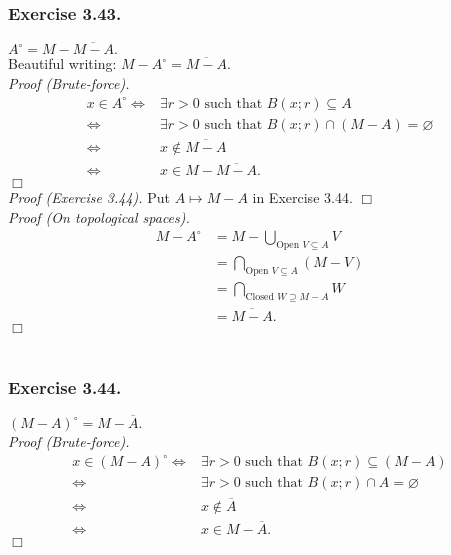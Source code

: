 \documentclass{article}
\begin{document}
\subsubsection*{Exercise 3.43.}
\emph{$A^{\circ} = M - \overline{M - A}.$} \\

Beautiful writing: $M - A^{\circ} = \overline{M - A}$. \\

\emph{Proof (Brute-force).}
\begin{align*}
x \in A^{\circ}
\Longleftrightarrow&
\exists r > 0 \text{ such that } B(x;r) \subseteq A \\
\Longleftrightarrow&
\exists r > 0 \text{ such that } B(x;r) \cap (M - A) = \varnothing \\
\Longleftrightarrow&
x \not\in \overline{M - A} \\
\Longleftrightarrow&
x \in M - \overline{M - A}.
\end{align*}
$\Box$ \\

\emph{Proof (Exercise 3.44).}
Put $A \mapsto M-A$ in Exercise 3.44.
$\Box$ \\

\emph{Proof (On topological spaces).}
\begin{align*}
M - A^{\circ}
&= M - \bigcup_{\text{Open } V \subseteq A} V \\
&= \bigcap_{\text{Open } V \subseteq A} (M - V) \\
&= \bigcap_{\text{Closed } W \supseteq M-A} W \\
&= \overline{M - A}.
\end{align*}
$\Box$ \\\\






\subsubsection*{Exercise 3.44.}
\emph{$(M-A)^{\circ} = M - \overline{A}.$} \\

\emph{Proof (Brute-force).}
\begin{align*}
x \in (M-A)^{\circ}
\Longleftrightarrow&
\exists r > 0 \text{ such that } B(x;r) \subseteq (M - A) \\
\Longleftrightarrow&
\exists r > 0 \text{ such that } B(x;r) \cap A = \varnothing \\
\Longleftrightarrow&
x \not\in \overline{A} \\
\Longleftrightarrow&
x \in M - \overline{A}.
\end{align*}
$\Box$ \\
\end{document}
